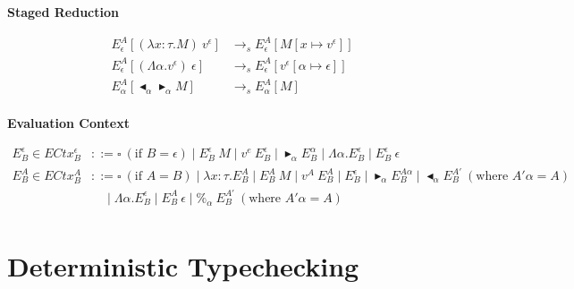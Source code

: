 \documentclass[9pt, a4paper]{extarticle}
\theoremstyle{break}
\newcommand{\figheader}[2]{
  \begin{flushleft}
    #2 {\bf \normalsize #1}
\end{flushleft}}
\newcommand{\TB}{\blacktriangleright}
\newcommand{\TBL}{\blacktriangleleft}
\begin{document}
\figheader{Staged Reduction}{}
\begin{align*}
    E^A_\epsilon [(\lambda x:\tau.M)\ v^\epsilon] & \longrightarrow_s E^A_\epsilon[M[x\mapsto v^\epsilon]] \\
    E^A_\epsilon [(\Lambda\alpha.v^\epsilon)\ \epsilon] & \longrightarrow_s E^A_\epsilon[v^\epsilon[\alpha\mapsto \epsilon]] \\
    E^A_\alpha [\TBL_\alpha \TB_\alpha M] & \longrightarrow_s E^A_\alpha[M] \\
\end{align*}

\figheader{Evaluation Context}{}
\begin{align*}
    E^\epsilon_B \in ECtx^\epsilon_B & ::= \square\ (\text{if\ } B = \epsilon) \mid E^\epsilon_B\ M \mid v^e\ E^\epsilon_B
                                           \mid \TB_\alpha E^\alpha_B \mid \Lambda\alpha.E^\epsilon_B
                                           \mid E^\epsilon_B\ \epsilon  \\
    E^A_B \in ECtx^A_B & ::= \square\ (\text{if } A = B) \mid \lambda x:\tau.E^A_B \mid E^A_B\ M \mid v^A\ E^A_B
                                           \mid E^\epsilon_B \mid \TB_\alpha E^{A\alpha}_B
                                           \mid \TBL_\alpha E^{A'}_B \ (\text{where } A'\alpha = A) \\
                                           & \quad \mid \Lambda\alpha.E^\epsilon_B
                                           \mid E^A_B\ \epsilon \mid \%_\alpha\ E^{A'}_B \ (\text{where } A'\alpha = A)\\
\end{align*}

\section{ Deterministic Typechecking }
\end{document}
